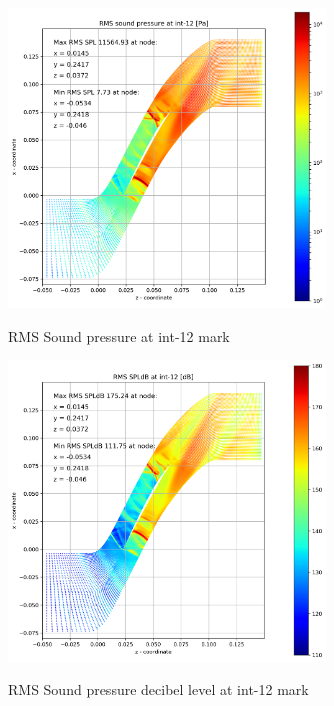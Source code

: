 \begin{figure}[ht]
  \centering
  \includegraphics[width=0.75\textwidth]{Figures/int-12-rms-spl.png} \label{int-12-rms-spl}
  \caption{RMS Sound pressure at int-12 mark}
  
  \vspace*{\floatsep}%

  \includegraphics[width=0.75\textwidth]{Figures/int-12-rms-spldb.png} \label{int-12-rms-spldb}
  \caption{RMS Sound pressure decibel level at int-12 mark}
\end{figure}
